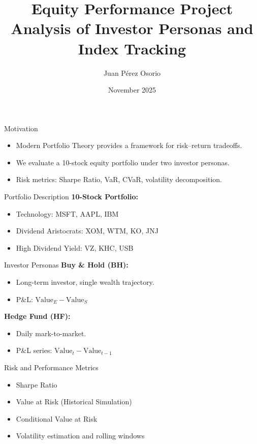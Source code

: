 \documentclass{beamer}
\title[Equity Performance Project]{Equity Performance Project \\ \large Analysis of Investor Personas and Index Tracking}
\author{Juan Pérez Osorio}
\institute{Department of Applied Mathematics and Statistics \\ Stony Brook University}
\date{November 2025}
\begin{document}
	
	\begin{frame}
		\titlepage
	\end{frame}
	
	\begin{frame}{Motivation}
		\begin{itemize}
			\item Modern Portfolio Theory provides a framework for risk–return tradeoffs.
			\item We evaluate a 10-stock equity portfolio under two investor personas.
			\item Risk metrics: Sharpe Ratio, VaR, CVaR, volatility decomposition.
		\end{itemize}
	\end{frame}
	
	\begin{frame}{Portfolio Description}
		\textbf{10-Stock Portfolio:}
		\begin{itemize}
			\item Technology: MSFT, AAPL, IBM
			\item Dividend Aristocrats: XOM, WTM, KO, JNJ
			\item High Dividend Yield: VZ, KHC, USB
		\end{itemize}
	\end{frame}
	
	\begin{frame}{Investor Personas}
		\textbf{Buy \& Hold (BH):}
		\begin{itemize}
			\item Long-term investor, single wealth trajectory.
			\item P\&L: \( \text{Value}_E - \text{Value}_S \)
		\end{itemize}
		
		\vspace{4mm}
		
		\textbf{Hedge Fund (HF):}
		\begin{itemize}
			\item Daily mark-to-market.
			\item P\&L series: \( \text{Value}_t - \text{Value}_{t-1} \)
		\end{itemize}
	\end{frame}
	
	\begin{frame}{Risk and Performance Metrics}
		\begin{itemize}
			\item Sharpe Ratio
			\item Value at Risk (Historical Simulation)
			\item Conditional Value at Risk
			\item Volatility estimation and rolling windows
		\end{itemize}
	\end{frame}
	
\end{document}
